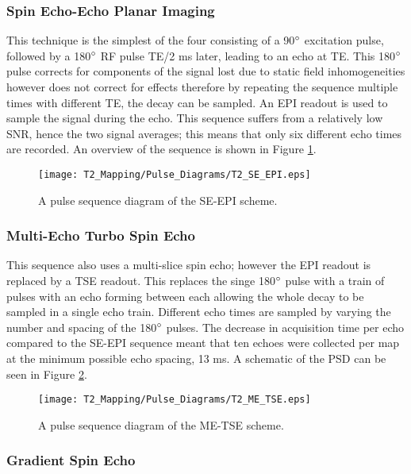 \subsubsection{Spin Echo-Echo Planar Imaging}
This technique is the simplest of the four consisting of a 90$\degree$ excitation pulse, followed by a 180$\degree$ \ac{RF} pulse \ac{TE}/2 ms later, leading to an echo at \ac{TE}. This 180$\degree$ pulse corrects for components of the signal lost due to static field inhomogeneities however does not correct for \ttwo effects therefore by repeating the sequence multiple times with different \ac{TE}, the \ttwo decay can be sampled. An \ac{EPI} readout is used to sample the signal during the echo. This sequence suffers from a relatively low \ac{SNR}, hence the two signal averages; this means that only six different echo times are recorded. An overview of the sequence is shown in Figure \ref{fig:t2_se-epi_seq}.

\begin{figure}[H]
	\centering
	\texttt{[image: T2\_Mapping/Pulse\_Diagrams/T2\_SE\_EPI.eps]}
	\caption{A pulse sequence diagram of the \ac{SE}-\ac{EPI} scheme.}
	\label{fig:t2_se-epi_seq}	
\end{figure}

\subsubsection{Multi-Echo Turbo Spin Echo}
This sequence also uses a multi-slice spin echo; however the \ac{EPI} readout is replaced by a \ac{TSE} readout. This replaces the singe 180$\degree$ pulse with a train of pulses with an echo forming between each allowing the whole \ttwo decay to be sampled in a single echo train. Different echo times are sampled by varying the number and spacing of the 180$\degree$ pulses. The decrease in acquisition time per echo compared to the \ac{SE}-\ac{EPI} sequence meant that ten echoes were collected per \ttwo map at the minimum possible echo spacing, 13 ms. A schematic of the \ac{PSD} can be seen in Figure \ref{fig:t2_me-tse_seq}.

\begin{figure}[H]
	\centering
	\texttt{[image: T2\_Mapping/Pulse\_Diagrams/T2\_ME\_TSE.eps]}
	\caption{A pulse sequence diagram of the \ac{ME-TSE} scheme.}
	\label{fig:t2_me-tse_seq}	
\end{figure}

\subsubsection{Gradient Spin Echo}

